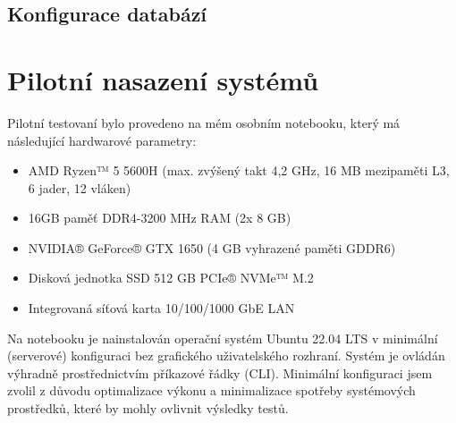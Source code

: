 \subsection{Konfigurace databází}

\section{Pilotní nasazení systémů}

Pilotní testovaní bylo provedeno na mém osobním notebooku, který má následující hardwarové parametry:
\begin{itemize}
    \item AMD Ryzen™ 5 5600H (max. zvýšený takt 4,2 GHz, 16 MB mezipaměti L3, 6 jader, 12 vláken)
    \item 16GB paměť DDR4-3200 MHz RAM (2x 8 GB)
    \item NVIDIA® GeForce® GTX 1650 (4 GB vyhrazené paměti GDDR6)
    \item Disková jednotka SSD 512 GB PCIe® NVMe™ M.2
    \item Integrovaná síťová karta 10/100/1000 GbE LAN
\end{itemize}
Na notebooku je nainstalován operační systém Ubuntu 22.04 LTS v minimální (serverové) konfiguraci bez grafického uživatelského rozhraní. 
Systém je ovládán výhradně prostřednictvím příkazové řádky (CLI).
Minimální konfiguraci jsem zvolil z důvodu optimalizace výkonu a minimalizace spotřeby systémových prostředků, které by mohly ovlivnit výsledky testů.


